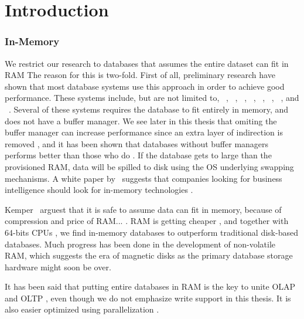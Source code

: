 \chapter{Introduction}
\label{chap:introduction}
\clearpage




\subsection{In-Memory}
\label{sub:In-Memory}
We restrict our research to databases that assumes the entire dataset can fit in RAM The reason for this is two-fold. First of all, preliminary research have shown that most database systems use this approach in order to achieve good performance. These systems include, but are not limited to, \oracle~\cite{Lahiri2015-mz}, \saph~\cite{Farber2012-vh}, \gorilla~\cite{Pelkonen2015-ko}, \qlikview~\cite{Qlik2011-ef}, \tableau~\cite{Kamkolkar2015-iq}, \monetdb~\cite{Boncz2002-yj}, \blink~\cite{Barber2012-xt}, and \sapnw~\cite{Lemke2010-is}. Several of these systems requires the database to fit entirely in memory, and does not have a buffer manager. We see later in this thesis that omiting the buffer manager can increase performance since an extra layer of indirection is removed \cite{Graefe2014-ds}, and it has been shown that databases without buffer managers performs better than those who do \cite{Ferrari2012-hm}. If the database gets to large than the provisioned RAM, data will be spilled to disk using the OS underlying swapping mechanisms.  A white paper by \qlikview~suggests that companies looking for business intelligence should look for in-memory technologies \cite{Bereanu2010-tj}.

Kemper \ea~arguest that it is safe to assume data can fit in memory, because of compression and price of RAM... \cite{Kemper2011-ap} . RAM is getting cheaper \cite{Exasol2014-xh}, and together with 64-bits CPUs \cite{Delaney2014-ip}, we find in-memory databases to outperform traditional disk-based databases. Much progress has been done in the development of non-volatile RAM, which suggests the era of magnetic disks as the primary database storage hardware might soon be over.

It has been said that putting entire databases in RAM is the key to unite OLAP and OLTP \cite{Faust2015-ke}, even though we do not emphasize write support in this thesis. It is also easier optimized using parallelization \cite{Psaroudakis2013-fn}.

